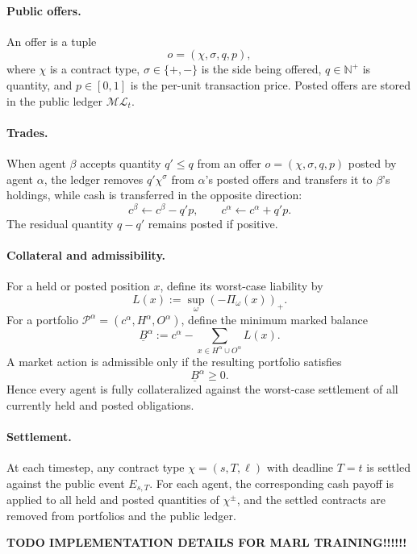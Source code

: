 \paragraph{Public offers.}
An offer is a tuple
\[
o=(\chi,\sigma,q,p),
\]
where $\chi$ is a contract type, $\sigma\in\{+,-\}$ is the side being offered, $q\in\mathbb N^+$ is quantity, and $p\in[0,1]$ is the per-unit transaction price. Posted offers are stored in the public ledger $\mathcal{ML}_t$.

\paragraph{Trades.}
When agent $\beta$ accepts quantity $q'\le q$ from an offer $o=(\chi,\sigma,q,p)$ posted by agent $\alpha$, the ledger removes $q'\chi^\sigma$ from $\alpha$'s posted offers and transfers it to $\beta$'s holdings, while cash is transferred in the opposite direction:
\[
c^\beta \leftarrow c^\beta - q'p,\qquad c^\alpha \leftarrow c^\alpha + q'p.
\]
The residual quantity $q-q'$ remains posted if positive.

\paragraph{Collateral and admissibility.}
For a held or posted position $x$, define its worst-case liability by
\[
L(x):=\sup_{\omega}(-\Pi_\omega(x))_+.
\]
For a portfolio $\mathcal P^\alpha=(c^\alpha,H^\alpha,O^\alpha)$, define the minimum marked balance
\[
\underline B^\alpha
:=
c^\alpha - \sum_{x\in H^\alpha\cup O^\alpha}L(x).
\]
A market action is admissible only if the resulting portfolio satisfies
\[
\underline B^\alpha \ge 0.
\]
Hence every agent is fully collateralized against the worst-case settlement of all currently held and posted obligations.

\paragraph{Settlement.}
At each timestep, any contract type $\chi=(s,T,\ell)$ with deadline $T=t$ is settled against the public event $E_{s,T}$. For each agent, the corresponding cash payoff is applied to all held and posted quantities of $\chi^\pm$, and the settled contracts are removed from portfolios and the public ledger.



\textbf{TODO IMPLEMENTATION DETAILS FOR MARL TRAINING!!!!!!}